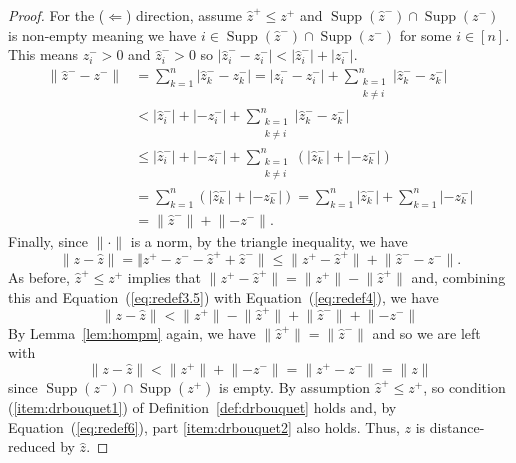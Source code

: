 \documentclass[a4paper, 12pt]{article}
\theoremstyle{plain}
\theoremstyle{definition}
\theoremstyle{remark}
\begin{document}
\begin{proof}
    \smallskip
    For the ($\Leftarrow$) direction, assume $\hat z^+ \le z^+$ and $\operatorname{Supp}(\hat z^{-}) \cap \operatorname{Supp}(z^{-})$ is non-empty meaning we have $i \in \operatorname{Supp}(\hat z^{-}) \cap \operatorname{Supp}(z^{-})$ for some $i \in [n]$. This means $z_i^->0$ and $\hat z^-_i>0$ so $|\hat z_i^- - z_i^- |<|\hat z_i^-| + |z_i^-|$.
    \begin{align} \label{eq:redef3.5}
        \lVert \hat z^{-} - z^{-} \rVert&=\sum_{k=1}^n |\hat z_k^{-}-z_k^{-}|=|\hat z^{-}_i- z^{-}_i|+\sum_{\substack{k =1 \\ k \neq i}}^n |\hat z^{-}_k-z^{-}_k| \\ \nonumber
        &<|\hat z^{-}_i|+|-z^{-}_i|+\sum_{\substack{k =1 \\ k \neq i}}^n |\hat z^{-}_k-z^{-}_k| \\ \nonumber
        &\le |\hat z^{-}_i|+|-z^{-}_i|+\sum_{\substack{k =1 \\ k \neq i}}^n \left(|\hat z^{-}_k|+|-z^{-}_k|\right) \\ \nonumber
        &=\sum_{k =1}^n \left(|\hat z^{-}_k|+|-z^{-}_k|\right)=\sum_{k =1}^n |\hat z^{-}_k|+\sum_{k =1}^n|-z^{-}_k|\\ \nonumber
        &=\lVert \hat z^{-} \rVert + \lVert -z^{-} \rVert.
    \end{align}
    Finally, since $\lVert \cdot \rVert$ is a norm, by the triangle inequality, we have
    \begin{equation}\label{eq:redef4}
         \lVert z - \hat z \rVert=\Vert  z^{+}- z^{-} -  \hat z^{+} + \hat z^{-} \rVert \le \lVert  z^{+} -  \hat z^{+} \rVert + \lVert \hat z^{-} - z^{-} \rVert.
    \end{equation}
   As before, $\hat z^{+} \le z^{+}$ implies that $\lVert z^{+} - \hat z^{+} \rVert = \lVert z^{+} \rVert - \lVert \hat z^{+} \rVert$ and, combining this and Equation~(\ref{eq:redef3.5}) with Equation~(\ref{eq:redef4}), we have
   \begin{equation} \label{eq:redef5}
       \lVert z - \hat z \rVert<  \lVert  z^{+} \rVert - \lVert  \hat z^{+} \rVert + \lVert \hat z^{-} \rVert +\lVert - z^{-} \rVert
   \end{equation}
   By Lemma~\ref{lem:hompm} again, we have $\lVert \hat z^+ \rVert = \lVert \hat z^- \rVert$ and so we are left with
     \begin{equation}  \label{eq:redef6}
       \lVert z - \hat z \rVert<  \lVert  z^{+} \rVert + \lVert -z^{-} \rVert=\lVert  z^{+} - z^{-} \rVert=\lVert z \rVert
   \end{equation}
    since $\operatorname{Supp}(z^{-}) \cap \operatorname{Supp}(z^{+})$ is empty. By assumption $\hat z^+ \le z^+$, so condition (\ref{item:drbouquet1}) of Definition~\ref{def:drbouquet} holds and, by Equation~(\ref{eq:redef6}), part \ref{item:drbouquet2} also holds. Thus, $z$ is distance-reduced by $\hat z$.
\end{proof}
\end{document}
